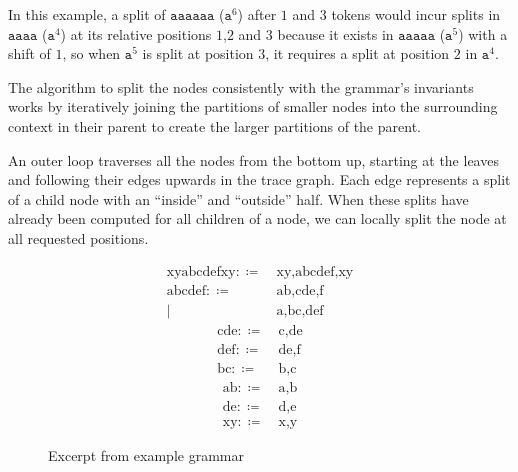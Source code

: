 \noindent
In this example, a split of $\texttt{aaaaaa}$ ($\texttt{a}^6$) after $1$ and $3$ tokens would incur splits in $\texttt{aaaa}$ ($\texttt{a}^4$) at its relative positions $1$,$2$ and $3$ because it exists in $\texttt{aaaaa}$ ($\texttt{a}^5$) with a shift of $1$, so when $\texttt{a}^5$ is split at position $3$, it requires a split at position $2$ in $\texttt{a}^4$.\par
\bigskip

The algorithm to split the nodes consistently with the grammar's invariants works by iteratively joining the partitions of smaller nodes into the surrounding context in their parent to create the larger partitions of the parent.\par

An outer loop traverses all the nodes from the bottom up, starting at the leaves and following their edges upwards in the trace graph. Each edge represents a split of a child node with an ``inside'' and ``outside'' half. When these splits have already been computed for all children of a node, we can locally split the node at all requested positions.\par

\newpage
\begin{figure}
    \ttfamily
    \begin{multicols}{3}
    \noindent
    \begin{align*}
        \text{xyabcdefxy} :\coloneqq &\ \text{xy,abcdef,xy}\\
        \text{abcdef} :\coloneqq &\ \text{ab,cde,f}\\
                |&\ \text{a,bc,def}
    \end{align*}
    \begin{align*}
        \text{cde} :\coloneqq &\ \text{c,de}\\
        \text{def} :\coloneqq &\ \text{de,f}\\
        \text{bc} :\coloneqq &\ \text{b,c}
    \end{align*}
    \begin{align*}
        \text{ab} :\coloneqq &\ \text{a,b}\\
        \text{de} :\coloneqq &\ \text{d,e}\\
        \text{xy} :\coloneqq &\ \text{x,y}
    \end{align*}
    \end{multicols}
    \caption{Excerpt from example grammar}
\end{figure}


